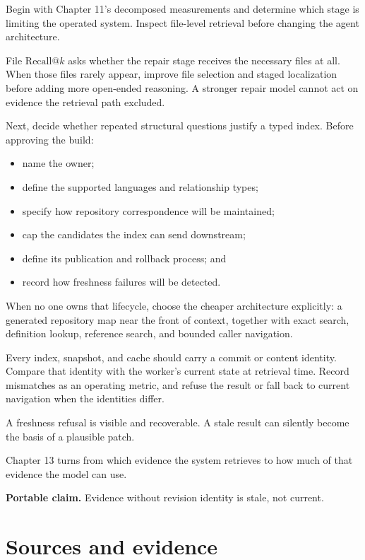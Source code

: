 Begin with Chapter 11's decomposed measurements and determine which stage is limiting the operated system. Inspect file-level retrieval before changing the agent architecture.

File \(\mathrm{Recall}@k\) asks whether the repair stage receives the necessary files at all. When those files rarely appear, improve file selection and staged localization before adding more open-ended reasoning. A stronger repair model cannot act on evidence the retrieval path excluded.


Next, decide whether repeated structural questions justify a typed index. Before approving the build:

\begin{itemize}
\tightlist
\item
  name the owner;
\item
  define the supported languages and relationship types;
\item
  specify how repository correspondence will be maintained;
\item
  cap the candidates the index can send downstream;
\item
  define its publication and rollback process; and
\item
  record how freshness failures will be detected.
\end{itemize}

When no one owns that lifecycle, choose the cheaper architecture explicitly: a generated repository map near the front of context, together with exact search, definition lookup, reference search, and bounded caller navigation.

Every index, snapshot, and cache should carry a commit or content identity. Compare that identity with the worker's current state at retrieval time. Record mismatches as an operating metric, and refuse the result or fall back to current navigation when the identities differ.

A freshness refusal is visible and recoverable. A stale result can silently become the basis of a plausible patch.

Chapter 13 turns from which evidence the system retrieves to how much of that evidence the model can use.

\textbf{Portable claim.} Evidence without revision identity is stale, not current.

\section*{Sources and evidence}

